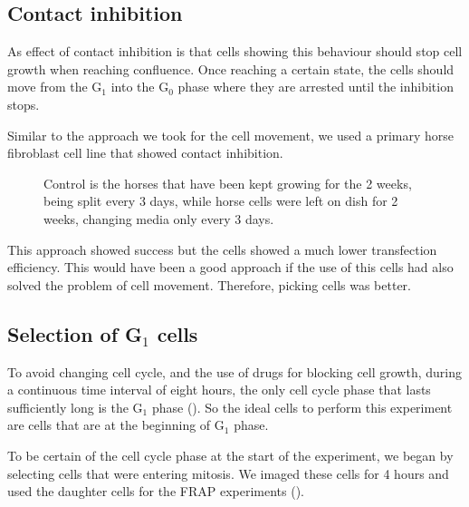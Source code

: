   \subsection{Contact inhibition}
  \label{sec:frap-cell-cycle-horse}
    
    As effect of contact inhibition is that cells showing this behaviour should stop cell
    growth when reaching confluence. Once reaching a certain state, the cells should move from
    the G$_1$ into the G$_0$ phase where they are arrested until the inhibition stops.
    
    Similar to the approach we took for the cell movement, we used a primary horse fibroblast
    cell line that showed contact inhibition.
    
    \begin{figure}
      \centering
                   {Control is the horses that have been kept growing for the 2 weeks,
                    being split every 3 days, while horse cells were left on dish for
                    2 weeks, changing media only every 3 days.}
      \label{fig:horse-facs}
    \end{figure}
    
    This approach showed success  but the cells showed a much lower transfection efficiency. This
    would have been a good approach if the use of this cells had also solved the problem of cell
    movement. Therefore, picking cells was better.

  \subsection{Selection of G$_1$ cells}
  
    To avoid changing cell cycle, and the use of drugs for blocking cell growth, during a
    continuous time interval of eight hours, the only cell cycle phase that lasts sufficiently
    long is the G$_1$ phase (). So the ideal cells to perform this
    experiment are cells that are at the beginning of G$_1$ phase.
    
    To be certain of the cell cycle phase at the start of the experiment, we began by selecting
    cells that were entering mitosis. We imaged these cells for 4 hours and used the daughter cells
    for the FRAP experiments ().
    
